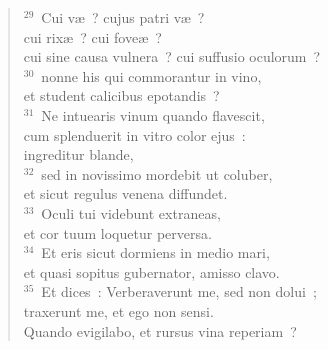 \begin{flushleft}\begin{verse}${}^{29}$~Cui v\ae~? cujus patri v\ae~?\\ cui rix\ae~? cui fove\ae~?\\ cui sine causa vulnera~? cui suffusio oculorum~?\\
${}^{30}$~nonne his qui commorantur in vino,\\ et student calicibus epotandis~?\\
${}^{31}$~Ne intuearis vinum quando flavescit,\\ cum splenduerit in vitro color ejus~:\\ ingreditur blande,\\
${}^{32}$~sed in novissimo mordebit ut coluber,\\ et sicut regulus venena diffundet.\\
${}^{33}$~Oculi tui videbunt extraneas,\\ et cor tuum loquetur perversa.\\
${}^{34}$~Et eris sicut dormiens in medio mari,\\ et quasi sopitus gubernator, amisso clavo.\\
${}^{35}$~Et dices~: Verberaverunt me, sed non dolui~;\\ traxerunt me, et ego non sensi.\\ Quando evigilabo, et rursus vina reperiam~?\end{verse}\end{flushleft}


